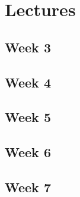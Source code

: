 \section{Lectures}

\subsection{Week 3}


\newpage

\subsection{Week 4}


\newpage

\subsection{Week 5}



\subsection{Week 6}



\subsection{Week 7}
